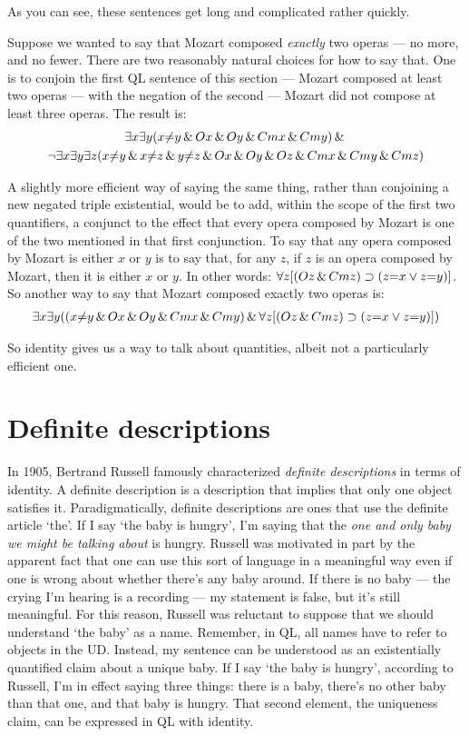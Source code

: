 As you can see, these sentences get long and complicated rather quickly.

Suppose we wanted to say that Mozart composed \emph{exactly} two operas --- no more, and no fewer. There are two reasonably natural choices for how to say that. One is to conjoin the first QL sentence of this section --- Mozart composed at least two operas --- with the negation of the second --- Mozart did not compose at least three operas. The result is:
\begin{multline*}
\exists x \exists y (x {\neq} y \,\&\, Ox \,\&\, Oy \,\&\, Cmx \,\&\, Cmy) \,\&\, \\ \neg \exists x \exists y \exists z (x {\neq} y \,\&\, x {\neq} z \,\&\, y {\neq} z \,\&\, Ox \,\&\, Oy \,\&\, Oz \,\&\, Cmx \,\&\, Cmy \,\&\, Cmz)
\end{multline*}

A slightly more efficient way of saying the same thing, rather than conjoining a new negated triple existential, would be to add, within the scope of the first two quantifiers, a conjunct to the effect that every opera composed by Mozart is one of the two mentioned in that first conjunction. To say that any opera composed by Mozart is either $x$ or $y$ is to say that, for any $z$, if $z$ is an opera composed by Mozart, then it is either $x$ or $y$. In other words: $\forall z [(Oz \,\&\, Cmz) \supset (z{=}x \vee z{=}y)]$. So another way to say that Mozart composed exactly two operas is:
\begin{multline*}
\exists x \exists y ((x {\neq} y  \,\&\,  Ox \,\&\, Oy \,\&\,  Cmx \,\&\, Cmy) \,\&\, \forall z [(Oz \,\&\, Cmz) \supset (z{=}x \vee z{=}y)])
\end{multline*}

So identity gives us a way to talk about quantities, albeit not a particularly efficient one.



\section{Definite descriptions}
\label{sec.defdesc}
In 1905, Bertrand Russell famously characterized \emph{definite descriptions} in terms of identity. A definite description is a description that implies that only one object satisfies it. Paradigmatically, definite descriptions are ones that use the definite article `the'. If I say `the baby is hungry', I'm saying that the \emph{one and only baby we might be talking about} is hungry. Russell was motivated in part by the apparent fact that one can use this sort of language in a meaningful way even if one is wrong about whether there's any baby around. If there is no baby --- the crying I'm hearing is a recording --- my statement is false, but it's still meaningful. For this reason, Russell was reluctant to suppose that we should understand `the baby' as a name. Remember, in QL, all names have to refer to objects in the UD. Instead, my sentence can be understood as an existentially quantified claim about a unique baby. If I say `the baby is hungry', according to Russell, I'm in effect saying three things: there is a baby, there's no other baby than that one, and that baby is hungry. That second element, the uniqueness claim, can be expressed in QL with identity. 

